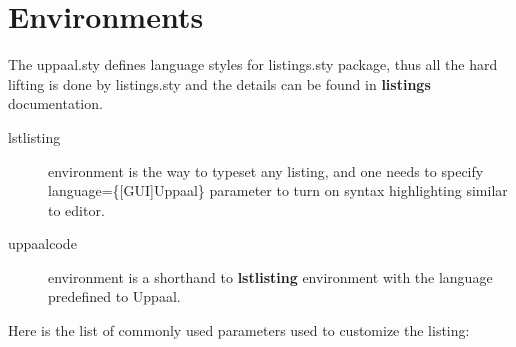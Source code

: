 \documentclass[english,paper=a4,final]{article}
\begin{document}
\section{Environments}
The {\ttfamily uppaal.sty} defines \uppaal language styles for {\ttfamily listings.sty} package, thus all the hard lifting is done by {\ttfamily listings.sty} and the details can be found in {\bfseries listings} documentation.
\begin{description}
\item[lstlisting] environment is the way to typeset any listing, and one needs to specify {\ttfamily language=\{[GUI]Uppaal\}} parameter to turn on syntax highlighting similar to \uppaal editor.
\item[uppaalcode] environment is a shorthand to {\bfseries lstlisting} environment with the language predefined to {\ttfamily [GUI]Uppaal}.
\end{description}
Here is the list of commonly used parameters used to customize the listing:
\end{document}
